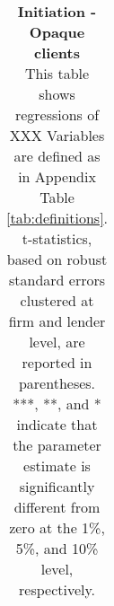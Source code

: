 \begin{table}[H] \begin{center} 
		\caption{\textbf{Initiation - Opaque clients} \\ This table shows regressions of XXX Variables are defined as in Appendix Table \ref{tab:definitions}. t-statistics, based on robust standard errors clustered at firm and lender level, are reported in parentheses. ***, **, and * indicate that the parameter estimate is significantly different from zero at the 1\%, 5\%, and 10\% level, respectively. } %
		\label{tab:init_cross} 
		\begin{threeparttable}  \def\sym#1{\ifmmode^{#1}\else\(^{#1}\)\fi}
			\begin{tabular*}{.8\hsize}{@{\hskip\tabcolsep\extracolsep\fill}l*{3}{c}} \toprule
				 
				\bottomrule \end{tabular*}
\end{threeparttable}   \end{center} \end{table}
\clearpage \newpage

